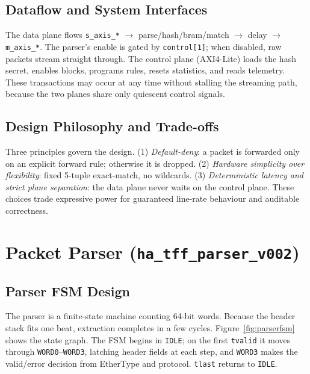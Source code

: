 \documentclass[12pt,twoside,openright]{book}
\begin{document}
\subsection{Dataflow and System Interfaces}

The data plane flows \texttt{s\_axis\_*} $\to$ parse/hash/bram/match $\to$ delay $\to$
\texttt{m\_axis\_*}. The parser's enable is gated by \texttt{control[1]}; when disabled, raw
packets stream straight through. The control plane (AXI4-Lite) loads the hash secret, enables
blocks, programs rules, resets statistics, and reads telemetry. These transactions may occur at any
time without stalling the streaming path, because the two planes share only quiescent control
signals.

\subsection{Design Philosophy and Trade-offs}

Three principles govern the design. (1) \emph{Default-deny}: a packet is forwarded only on an
explicit forward rule; otherwise it is dropped. (2) \emph{Hardware simplicity over flexibility}:
fixed 5-tuple exact-match, no wildcards. (3) \emph{Deterministic latency and strict plane
separation}: the data plane never waits on the control plane. These choices trade expressive power
for guaranteed line-rate behaviour and auditable correctness.

\section{Packet Parser (\texttt{ha\_tff\_parser\_v002})}

\subsection{Parser FSM Design}

The parser is a finite-state machine counting 64-bit words. Because the header stack fits one beat,
extraction completes in a few cycles. Figure~\ref{fig:parserfsm} shows the state graph. The FSM
begins in \texttt{IDLE}; on the first \texttt{tvalid} it moves through \texttt{WORD0}--\texttt{WORD3},
latching header fields at each step, and \texttt{WORD3} makes the valid/error decision from
EtherType and protocol. \texttt{tlast} returns to \texttt{IDLE}.
\end{document}
